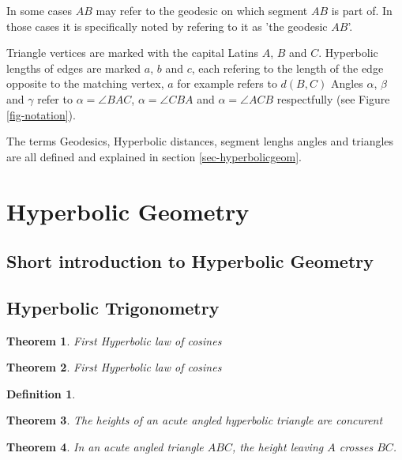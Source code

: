 \documentclass[a4paper,10pt]{article}
\newtheorem{theorem}{Theorem}[section]
\newtheorem{definition}{Definition}[section]
\begin{document}
In some cases $AB$ may refer to the geodesic on which segment $AB$ is part of.
In those cases it is specifically noted by refering to it as 'the geodesic $AB$'.

Triangle vertices are marked with the capital Latins $A$, $B$ and $C$.
Hyperbolic lengths of edges are marked $a$, $b$ and $c$, each refering to 
the length of the edge opposite
to the matching vertex, $a$ for example refers to $d\left(B, C\right)$ 
Angles $\alpha$, $\beta$ and $\gamma$ refer to $\alpha = \angle BAC$, 
$\alpha = \angle CBA$ and $\alpha = \angle ACB$ respectfully
(see Figure \ref{fig-notation}).

The terms Geodesics, Hyperbolic distances, segment lenghs angles and 
triangles are all defined and explained in section \ref{sec-hyperbolicgeom}.


\label{sec-hyperbolicgeom}
\section{Hyperbolic Geometry}
\subsection{Short introduction to Hyperbolic Geometry}
\subsection{Hyperbolic Trigonometry}

\label{cosine1}
\begin{theorem}
First Hyperbolic law of cosines
\end{theorem}

\label{cosine2}
\begin{theorem}
First Hyperbolic law of cosines
\end{theorem}

\label{hyperbolicheightexistance}
\begin{definition}

\end{definition}


\label{hyperbolicheights2}
\begin{theorem}
The heights of an acute angled hyperbolic triangle are concurent
\end{theorem}

\label{hyperbolicheights2}
\begin{theorem}
In an acute angled triangle $ABC$, the height leaving $A$ crosses $BC$.
\end{theorem}
\end{document}
